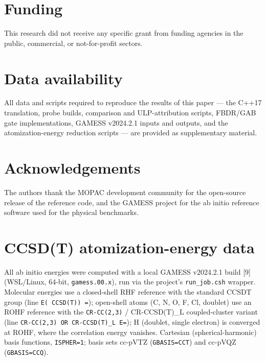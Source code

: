 \documentclass[preprint,12pt]{elsarticle}
\begin{document}
\section*{Funding}
This research did not receive any specific grant from funding agencies in the public, commercial, or not-for-profit sectors.

\section*{Data availability}
All data and scripts required to reproduce the results of this paper --- the C++17 translation, probe builds, comparison and ULP-attribution scripts, FBDR/GAB gate implementations, GAMESS v2024.2.1 inputs and outputs, and the atomization-energy reduction scripts --- are provided as supplementary material.

\section*{Acknowledgements}
The authors thank the MOPAC development community for the open-source release of the reference code, and the GAMESS project for the ab initio reference software used for the physical benchmarks.

\appendix
\section{CCSD(T) atomization-energy data}\label{app:ccsd}

All ab initio energies were computed with a local GAMESS v2024.2.1 build [9] (WSL/Linux, 64-bit, \texttt{gamess.00.x}), run via the project's \texttt{run\_job.csh} wrapper. Molecular energies use a closed-shell RHF reference with the standard CCSDT group (line \texttt{E(   CCSD(T)) =}); open-shell atoms (C, N, O, F, Cl, doublet) use an ROHF reference with the \texttt{CR-CC(2,3)} / CR-CCSD(T)\_L coupled-cluster variant (line \texttt{CR-CC(2,3) OR CR-CCSD(T)\_L E=}); H (doublet, single electron) is converged at ROHF, where the correlation energy vanishes. Cartesian (spherical-harmonic) basis functions, \texttt{ISPHER=1}; basis sets cc-pVTZ (\texttt{GBASIS=CCT}) and cc-pVQZ (\texttt{GBASIS=CCQ}).
\end{document}

